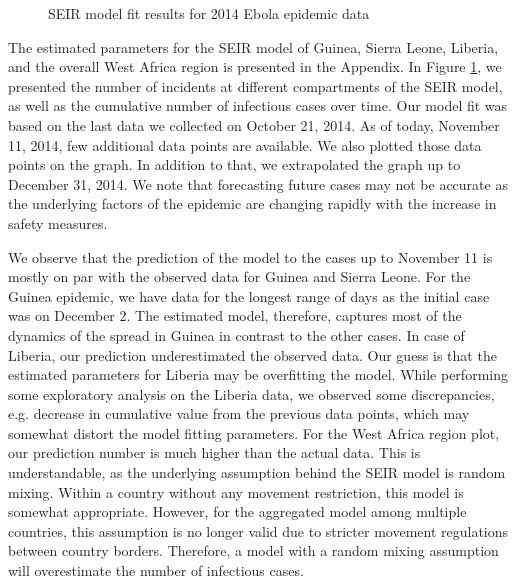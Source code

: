 \documentclass[10pt, journal,onecolumn]{IEEEtran}
\begin{document}
\begin{figure}[ht]
{  \label{fig:subfigure3}}
\quad
{}

\caption{SEIR model fit results for 2014 Ebola epidemic data}
\label{Fig:figurePrediction}
\end{figure}


The estimated parameters for the SEIR model of Guinea, Sierra Leone, Liberia, and the overall West Africa 
region is presented in the Appendix. In Figure \ref{Fig:figurePrediction}, we presented the
number of incidents at different compartments of the SEIR model, as well as the cumulative number of
infectious cases over time. Our model fit was based on the last data we collected on October 21,
2014. As of today, November 11, 2014, few additional data points are available. We also plotted
those data points on the graph. In addition to that, we extrapolated the graph up to December 31,
2014. We note that forecasting future cases may not be accurate as the underlying factors
of the epidemic are changing rapidly with the increase in safety measures.

We observe that the
prediction of the model to the cases up to November 11 is mostly on par with the observed data for
Guinea and Sierra Leone. For the Guinea epidemic, we have data for the longest range of
days as the initial case was on December 2. The estimated model, therefore, captures most of the
dynamics of the spread in Guinea in contrast to the other cases. In case of Liberia, our prediction
underestimated the observed data. Our guess is that the estimated parameters for Liberia may be
overfitting the model. While performing some exploratory analysis on the Liberia data, we observed
some discrepancies, e.g. decrease in cumulative value from the previous data points, which may
somewhat distort the model fitting parameters. For the West Africa region plot, our prediction
number is much higher than the actual data. This is understandable, as the underlying assumption
behind the SEIR model is random mixing.  Within a country without any movement restriction, this model
is somewhat appropriate. However, for the aggregated model among multiple countries, this
assumption is no longer valid due to stricter movement regulations between country borders.
Therefore, a model with a random mixing assumption will overestimate the number of infectious cases.
\end{document}
